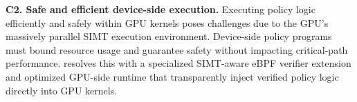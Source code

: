 
\textbf{C2. Safe and efficient device-side execution.} Executing policy logic efficiently and safely within GPU kernels poses challenges due to the GPU's massively parallel SIMT execution environment. Device-side policy programs must bound resource usage and guarantee safety without impacting critical-path performance. \sys{} resolves this with a specialized SIMT-aware eBPF verifier extension and optimized GPU-side runtime that transparently inject verified policy logic directly into GPU kernels.


